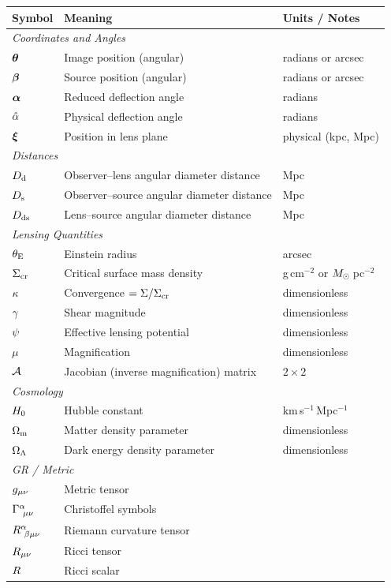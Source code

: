 \documentclass[12pt,letterpaper,twoside]{report}
\begin{document}
\begin{center}
\begin{tabular}{lll}
\toprule
\textbf{Symbol} & \textbf{Meaning} & \textbf{Units / Notes} \\
\midrule
\multicolumn{3}{l}{\textit{Coordinates and Angles}} \\
$\boldsymbol{\theta}$    & Image position (angular)      & radians or arcsec \\
$\boldsymbol{\beta}$     & Source position (angular)      & radians or arcsec \\
$\boldsymbol{\alpha}$    & Reduced deflection angle       & radians \\
$\hat{\alpha}$    & Physical deflection angle      & radians \\
$\boldsymbol{\xi}$       & Position in lens plane         & physical (kpc, Mpc) \\
\midrule
\multicolumn{3}{l}{\textit{Distances}} \\
$D_{\mathrm{d}}$          & Observer--lens angular diameter distance   & Mpc \\
$D_{\mathrm{s}}$          & Observer--source angular diameter distance & Mpc \\
$D_{\mathrm{ds}}$         & Lens--source angular diameter distance     & Mpc \\
\midrule
\multicolumn{3}{l}{\textit{Lensing Quantities}} \\
$\theta_{\mathrm{E}}$      & Einstein radius                & arcsec \\
$\Sigma_{\mathrm{cr}}$     & Critical surface mass density  & g\,cm$^{-2}$ or $M_{\odot}$\,pc$^{-2}$ \\
$\kappa$      & Convergence $= \Sigma/\Sigma_{\mathrm{cr}}$ & dimensionless \\
$\gamma$      & Shear magnitude                & dimensionless \\
$\psi$        & Effective lensing potential     & dimensionless \\
$\mu$          & Magnification                  & dimensionless \\
$\mathcal{A}$        & Jacobian (inverse magnification) matrix & $2 \times 2$ \\
\midrule
\multicolumn{3}{l}{\textit{Cosmology}} \\
$H_0$      & Hubble constant                & km\,s$^{-1}$\,Mpc$^{-1}$ \\
$\Omega_{\mathrm{m}}$      & Matter density parameter       & dimensionless \\
$\Omega_{\Lambda}$      & Dark energy density parameter  & dimensionless \\
\midrule
\multicolumn{3}{l}{\textit{GR / Metric}} \\
$g_{\mu\nu}$      & Metric tensor                  & \\
$\Gamma^{\alpha}_{\ \mu \nu}$ & Christoffel symbols & \\
$R^{\alpha}_{\ \beta \mu \nu}$ & Riemann curvature tensor & \\
$R_{\mu\nu}$       & Ricci tensor                   & \\
$R$      & Ricci scalar                   & \\
\bottomrule
\end{tabular}
\end{center}
\end{document}
